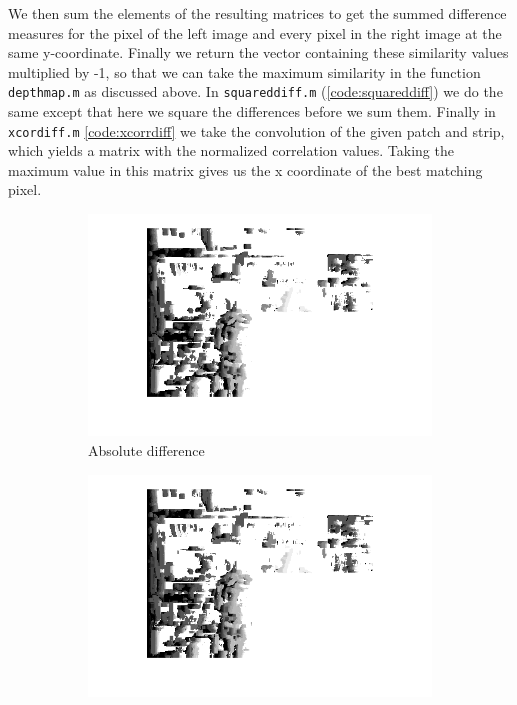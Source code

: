 \documentclass{article}
\begin{document}
We then sum the elements of the resulting matrices to get the summed difference measures for the pixel of the left image and every pixel in the right image at the same y-coordinate. Finally we return the vector containing these similarity values multiplied by -1, so that we can take the maximum similarity in the function \texttt{depthmap.m} as discussed above. In \texttt{squareddiff.m} (\ref{code:squareddiff}) we do the same except that here we square the differences before we sum them.
Finally in \texttt{xcordiff.m} \ref{code:xcorrdiff} we take the convolution of the given patch and strip, which yields a matrix with the normalized correlation values. Taking the maximum value in this matrix gives us the x coordinate of the best matching pixel.

\begin{figure}[ht!]
 \centering
 \begin{subfigure}{.49\textwidth}
  \centering
  \includegraphics[width=\linewidth]{abs_dev15.png}
  \caption{Absolute difference}
  \label{fig1a}
 \end{subfigure}
 \begin{subfigure}{.49\textwidth}
  \centering
  \includegraphics[width=\linewidth]{squared_dev15.png}

\end{subfigure}
\end{figure}
\end{document}

